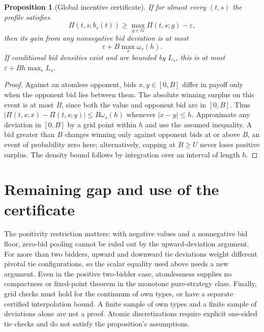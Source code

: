 \documentclass[11pt]{article}
\newtheorem{proposition}[theorem]{Proposition}
\theoremstyle{definition}
\theoremstyle{remark}
\begin{document}
\begin{proposition}[Global incentive certificate]
If for almost every $(t,s)$ the profile satisfies
\[
 \Pi(t,s;b_s(t))\ge \max_{g\in G}\Pi(t,s;g)-\varepsilon,
\]
then its gain from any nonnegative bid deviation is at most
\[
 \varepsilon+B\max_s\omega_s(h).
\]
If conditional bid densities exist and are bounded by $L_s$, this is at most $\varepsilon+Bh\max_s L_s$.
\end{proposition}
\begin{proof}
Against an atomless opponent, bids $x,y\in[0,B]$ differ in payoff only when the opponent bid lies between them. The absolute winning surplus on this event is at most $B$, since both the value and opponent bid are in $[0,B]$. Thus $|\Pi(t,s;x)-\Pi(t,s;y)|\le B\omega_s(h)$ whenever $|x-y|\le h$. Approximate any deviation in $[0,B]$ by a grid point within $h$ and use the assumed inequality. A bid greater than $B$ changes winning only against opponent bids at or above $B$, an event of probability zero here; alternatively, capping at $B\ge U$ never loses positive surplus. The density bound follows by integration over an interval of length $h$.
\end{proof}

\section{Remaining gap and use of the certificate}
The positivity restriction matters: with negative values and a nonnegative bid floor, zero-bid pooling cannot be ruled out by the upward-deviation argument. For more than two bidders, upward and downward tie deviations weight different pivotal tie configurations, so the scalar equality used above needs a new argument. Even in the positive two-bidder case, atomlessness supplies no compactness or fixed-point theorem in the monotone pure-strategy class. Finally, grid checks must hold for the continuum of own types, or have a separate certified interpolation bound. A finite sample of own types and a finite sample of deviations alone are not a proof. Atomic discretizations require explicit one-sided tie checks and do not satisfy the proposition's assumptions.
\end{document}
